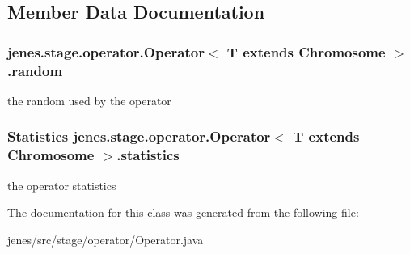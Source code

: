 \subsection{Member Data Documentation}
\hypertarget{classjenes_1_1stage_1_1operator_1_1_operator_3_01_t_01extends_01_chromosome_01_4_af8cbd8837ce95101e238bdcc3dce5573}{
\subsubsection[{random}]{ jenes.\-stage.\-operator.\-Operator$<$ T extends Chromosome $>$.random\hspace{0.3cm}{\ttfamily [protected]}}}\label{classjenes_1_1stage_1_1operator_1_1_operator_3_01_t_01extends_01_chromosome_01_4_af8cbd8837ce95101e238bdcc3dce5573}
the random used by the operator \hypertarget{classjenes_1_1stage_1_1operator_1_1_operator_3_01_t_01extends_01_chromosome_01_4_a45afa214a1e9109845c8f67165942675}{
\subsubsection[{statistics}]{\setlength{\rightskip}{0pt plus 5cm}Statistics jenes.\-stage.\-operator.\-Operator$<$ T extends Chromosome $>$.statistics\hspace{0.3cm}{\ttfamily [protected]}}}\label{classjenes_1_1stage_1_1operator_1_1_operator_3_01_t_01extends_01_chromosome_01_4_a45afa214a1e9109845c8f67165942675}
the operator statistics 

The documentation for this class was generated from the following file\-:\begin{DoxyCompactItemize}
\item 
jenes/src/stage/operator/Operator.\-java\end{DoxyCompactItemize}

